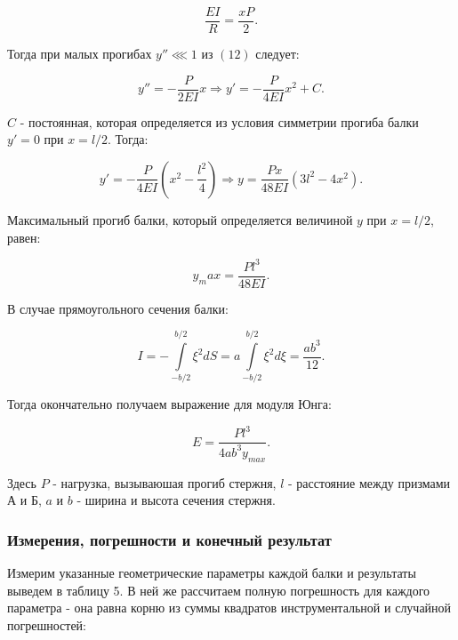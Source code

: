 \documentclass[a4paper,12pt]{report}
\begin{document}
\begin{equation}
	\frac{EI}{R}=\frac{xP}{2}.
	\label{form12}
\end{equation}

Тогда при малых прогибах $y''\lll 1$ из $(12)$ следует:

\begin{equation}
	y''=-\frac{P}{2EI}x \Rightarrow y'=-\frac{P}{4EI}x^2+C.
	\label{form12}
\end{equation}

$C$ - постоянная, которая определяется из условия симметрии прогиба балки $y'=0$ при $x=l/2$. Тогда:

\begin{equation}
	y'=-\frac{P}{4EI}(x^2-\frac{l^2}{4}) \Rightarrow y=\frac{Px}{48EI}(3l^2-4x^2).
	\label{form13}
\end{equation}

Максимальный прогиб балки, который определяется величиной $y$ при $x=l/2$, равен:

\begin{equation}	
	y_max=\frac{Pl^3}{48EI}.
	\label{form14}
\end{equation}

В случае прямоугольного сечения балки:

\begin{equation}
	I = -\int\limits_{-b/2}^{b/2}{\xi^2 dS}=a\int\limits_{-b/2}^{b/2}{\xi^2 d\xi} = \frac{ab^3}{12}.
	\label{form15}
\end{equation}

Тогда окончательно получаем выражение для модуля Юнга:

\begin{equation}
	E = \frac{Pl^3}{4ab^3y_{max}}.
	\label{form16}
\end{equation}

Здесь $P$ - нагрузка, вызываюшая прогиб стержня, $l$ - расстояние между призмами А и Б, $a$ и $b$ - ширина и высота сечения стержня.



\subsubsection*{Измерения, погрешности и конечный результат}



Измерим указанные геометрические параметры каждой балки и результаты выведем в таблицу 5. В ней же рассчитаем полную погрешность для каждого параметра - она равна корню из суммы квадратов инструментальной и случайной погрешностей:
\end{document}
